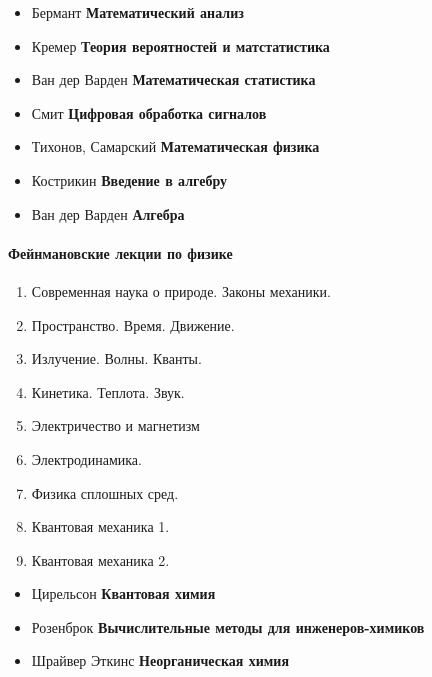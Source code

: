 


\begin{itemize}[nosep]
  \item Бермант \textbf{Математический анализ}\ \cite{bermant}
  \item Кремер \textbf{Теория вероятностей и матстатистика}\ \cite{kremer}
  \item Ван дер Варден \textbf{Математическая статистика}\ \cite{varver}
  \item Смит \textbf{Цифровая обработка сигналов}\ \cite{smitdsp}
  \item Тихонов, Самарский \textbf{Математическая физика}\ \cite{ts,tszad}
  \item Кострикин \textbf{Введение в алгебру}\ \cite{kostalg,kostlin}
  \item Ван дер Варден \textbf{Алгебра}\ \cite{vanalg}
\end{itemize}

\paragraph{Фейнмановские лекции по физике}
\begin{enumerate}[nosep]
  \item Современная наука о природе. Законы механики.\ \cite{fein1}
  \item Пространство. Время. Движение.\ \cite{fein2}
  \item Излучение. Волны. Кванты.\ \cite{fein3}
  \item Кинетика. Теплота. Звук.\ \cite{fein4}
  \item Электричество и магнетизм\ \cite{fein5}
  \item Электродинамика.\ \cite{fein6}
  \item Физика сплошных сред.\ \cite{fein7}
  \item Квантовая механика 1.\ \cite{fein8}
  \item Квантовая механика 2.\ \cite{fein9}
\end{enumerate}
\bigskip

\begin{itemize}[nosep]
  \item Цирельсон \textbf{Квантовая химия}\ \cite{cirel}
  \item Розенброк \textbf{Вычислительные методы для инженеров-химиков}\
  \cite{calchem}
  \item Шрайвер Эткинс \textbf{Неорганическая химия}\ \cite{shriver}
\end{itemize} 

